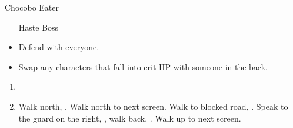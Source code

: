 \begin{battle}{Chocobo Eater}
  \begin{itemize}
    \tidusf Haste Boss
    \item Defend with everyone.
    \item Swap any characters that fall into crit HP with someone in the back.
  \end{itemize}
\end{battle}
\begin{enumerate}[resume]
  \item \sd
  \item Walk north, \save. Walk north to next screen. Walk to blocked road, \sd. Speak to the guard on the right, \sd, walk back, \sd. Walk up to next screen.
\end{enumerate}